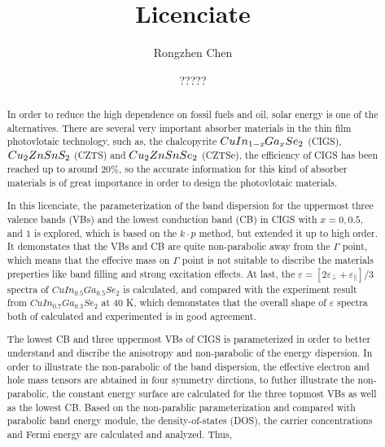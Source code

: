 \documentclass[a4paper]{report}
\begin{document}
\title{Licenciate}
\author{Rongzhen Chen}
\date{?????}

\maketitle





\begin{abstract}
\noindent In order to reduce the high dependence on fossil fuels and oil, solar energy is one of the alternatives.
There are several very important absorber materials in the thin film photovlotaic technology, such as, the chalcopyrite $CuIn_{1-\textit{x}}Ga_{x}Se_2$ (CIGS), $Cu_2ZnSnS_2$ (CZTS) and $Cu_2ZnSnSe_2$ (CZTSe),
the efficiency of CIGS has been reached up to around 20\%, so the accurate information for this kind of absorber materials is of great importance in order to
design the photovlotaic materials. 

\noindent In this licenciate, the parameterization of the band dispersion for the uppermost three valence bands (VBs) and the lowest conduction
band (CB) in CIGS with $x=0, 0.5$, and $1$ is explored, which is based on the $k \cdot p$ method, but extended it up to high order. It demonstates that the VBs and CB
are quite non-parabolic away from the $\Gamma$ point, which means that the effecive mass on $\Gamma$ point is not suitable to discribe the materials preperties like 
band filling and strong excitation effects. At last, the $\varepsilon = [2\varepsilon_{\perp}+\varepsilon_{\parallel}]/3$ spectra of $CuIn_{0.5}Ga_{0.5}Se_2$ is calculated, and compared with the
experiment result from $CuIn_{0.7}Ga_{0.3}Se_2$ at 40 K, which demonstates that the overall shape of $\varepsilon$ spectra both of calculated and experimented 
is in good agreement.

\noindent The lowest CB and three uppermost VBs of CIGS is parameterized in order to better understand and discribe the anisotropy and non-parabolic of the energy dispersion.
In order to illustrate the non-parabolic of the band dispersion, the effective electron and hole mass tensors are abtained in four symmetry dirctions, to futher illustrate
the non-parabolic, the constant energy surface are calculated for the three topmost VBs as well as the lowest CB. Based on the non-parablic parameterization and compared
with parabolic band energy module, the density-of-states (DOS), the carrier concentrations and Fermi energy are calculated and analyzed. Thus, 



\end{abstract}
\end{document}
